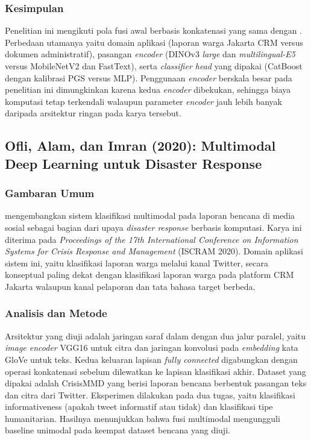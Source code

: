 \subsubsection{Kesimpulan}

Penelitian ini mengikuti pola fusi awal berbasis konkatenasi yang sama dengan \citet{audebertMultimodalDoc2019}. Perbedaan utamanya yaitu domain aplikasi (laporan warga Jakarta CRM versus dokumen administratif), pasangan \textit{encoder} (DINOv3 \textit{large} dan \textit{multilingual-E5} versus MobileNetV2 dan FastText), serta \textit{classifier head} yang dipakai (CatBoost dengan kalibrasi PGS versus MLP). Penggunaan \textit{encoder} berskala besar pada penelitian ini dimungkinkan karena kedua \textit{encoder} dibekukan, sehingga biaya komputasi tetap terkendali walaupun parameter \textit{encoder} jauh lebih banyak daripada arsitektur ringan pada karya tersebut.

\subsection{Ofli, Alam, dan Imran (2020): Multimodal Deep Learning untuk Disaster Response}

\subsubsection{Gambaran Umum}

\citet{ofliMultimodalDisaster2020} mengembangkan sistem klasifikasi multimodal pada laporan bencana di media sosial sebagai bagian dari upaya \textit{disaster response} berbasis komputasi. Karya ini diterima pada \textit{Proceedings of the 17th International Conference on Information Systems for Crisis Response and Management} (ISCRAM 2020). Domain aplikasi sistem ini, yaitu klasifikasi laporan warga melalui kanal Twitter, secara konseptual paling dekat dengan klasifikasi laporan warga pada platform CRM Jakarta walaupun kanal pelaporan dan tata bahasa target berbeda.

\subsubsection{Analisis dan Metode}

Arsitektur yang diuji adalah jaringan saraf dalam dengan dua jalur paralel, yaitu \textit{image encoder} VGG16 untuk citra dan jaringan konvolusi pada \textit{embedding} kata GloVe untuk teks. Kedua keluaran lapisan \textit{fully connected} digabungkan dengan operasi konkatenasi sebelum dilewatkan ke lapisan klasifikasi akhir. Dataset yang dipakai adalah CrisisMMD yang berisi laporan bencana berbentuk pasangan teks dan citra dari Twitter. Eksperimen dilakukan pada dua tugas, yaitu klasifikasi informativeness (apakah tweet informatif atau tidak) dan klasifikasi tipe humanitarian. Hasilnya menunjukkan bahwa fusi multimodal mengungguli baseline unimodal pada keempat dataset bencana yang diuji.

